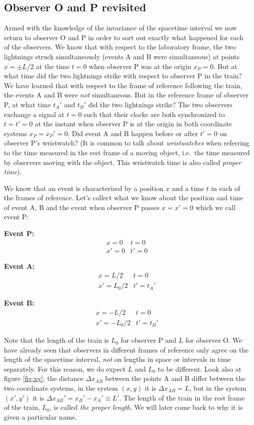 {\begin{multicols}{2}
\section{Observer O and P revisited}
\label{sect:oandp}

Armed with the knowledge of the invariance of the spacetime interval we now return to observer O and P in order to sort out exactly what happened for each of the observers. We know that with respect to the laboratory frame, the two lightnings struck simultaneously (events A and B were simultaneous) at points $x=\pm L/2$ at the time $t=0$ when observer P was at the origin $x_P=0$. But at what time did the two lightnings strike with respect to observer P in the train? We have learned that with respect to the frame of reference following the train, the events A and B were \emph{not} simultaneous. But in the reference frame of observer P, at what time $t_A'$ and $t_B'$ did the two lightnings strike? The two observers exchange a signal at $t=0$ such that their clocks are both synchronized to $t=t'=0$ at the instant when observer P is at the origin in both coordinate systems $x_P=x_P'=0$. Did event A and B happen before or after $t'=0$ on observer P's wristwatch? (It is common to talk about \emph{wristwatches} when referring to the time measured in the rest frame of a moving object, i.e.\ the time measured by observers moving with the object. This wristwatch time is also called {\it proper time\label{pg:propertime}}).

We know that an event is characterized by a position $x$ and a time $t$ in each of the frames of reference. Let's collect what we know about the position and time of event A, B and the event when observer P passes $x=x'=0$ which we call event P:

{\bf Event P:}
\begin{eqnarray*}
x=0 & t=0\\
x'=0 & t'=0
\end{eqnarray*}

{\bf Event A:}
\begin{eqnarray*}
x=L/2 & t=0\\
x'=L_0/2 & t'=t_A'
\end{eqnarray*}

{\bf Event B:}
\begin{eqnarray*}
x=-L/2 & t=0\\
x'=-L_0/2 & t'=t_B'
\end{eqnarray*}

Note that the length of the train is $L_0$ for observer P and $L$ for observer O. We have already seen that observers in different frames of reference only agree on the length of the spacetime interval, \emph{not} on lengths in space or intervals in time separately. For this reason, we do expect $L$ and $L_0$ to be different. Look also at figure \ref{fig:xy}, the distance $\Delta x_{AB}$ between the points A and B differ between the two coordinate systems, in the system $(x,y)$ it is $\Delta x_{AB}=L$, but in the system $(x',y')$ it is $\Delta x_{AB}'=x_B'-x_A'\equiv L'$. The length of the train in the rest frame of the train, $L_0$, is called {\it the proper length\label{pg:properlength}}. We will later come back to why it is given a particular name.


\end{multicols}}
